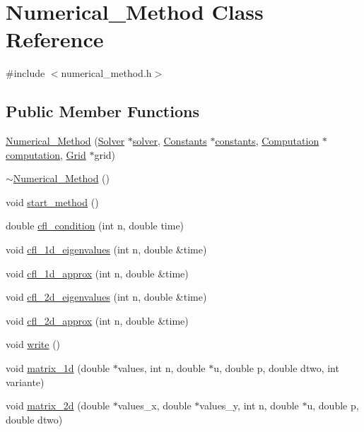 \hypertarget{classNumerical__Method}{\section{Numerical\-\_\-\-Method Class Reference}
\label{classNumerical__Method}
}


{\ttfamily \#include $<$numerical\-\_\-method.\-h$>$}

\subsection*{Public Member Functions}
\begin{DoxyCompactItemize}
\item 
\hyperlink{classNumerical__Method_a85c50cdbf748553e9d31b4066d2c022f}{Numerical\-\_\-\-Method} (\hyperlink{classSolver}{Solver} $\ast$\hyperlink{classNumerical__Method_ace474723e7f6407dea6b099a0f5d82f6}{solver}, \hyperlink{classConstants}{Constants} $\ast$\hyperlink{classNumerical__Method_a63a7ffa9eb0ab132ae008aa4d1e0dfc6}{constants}, \hyperlink{classComputation}{Computation} $\ast$\hyperlink{classNumerical__Method_aec80d2974afbd7ed72f7b7592b0f7595}{computation}, \hyperlink{classGrid}{Grid} $\ast$grid)
\item 
\hyperlink{classNumerical__Method_af7b847dd302c8d489e944ca24cd79b79}{$\sim$\-Numerical\-\_\-\-Method} ()
\item 
void \hyperlink{classNumerical__Method_a181d5218fdf2aeaa738c94613ff0921c}{start\-\_\-method} ()
\item 
double \hyperlink{classNumerical__Method_ace0a53699bed22690e5dccacd912aff7}{cfl\-\_\-condition} (int n, double time)
\item 
void \hyperlink{classNumerical__Method_a67738f11775c38a65a5c80caf8d8d1b3}{cfl\-\_\-1d\-\_\-eigenvalues} (int n, double \&time)
\item 
void \hyperlink{classNumerical__Method_a2e803d77e4bda6927c0a6ae6a5a6204d}{cfl\-\_\-1d\-\_\-approx} (int n, double \&time)
\item 
void \hyperlink{classNumerical__Method_a5716ee699a4c14a4c2ba211f7182f846}{cfl\-\_\-2d\-\_\-eigenvalues} (int n, double \&time)
\item 
void \hyperlink{classNumerical__Method_ad757e76048489549664925eca952c315}{cfl\-\_\-2d\-\_\-approx} (int n, double \&time)
\item 
void \hyperlink{classNumerical__Method_ad93454872f20536000b9585631dfb7b9}{write} ()
\item 
void \hyperlink{classNumerical__Method_a47e020d020e45910016f893dfbca7294}{matrix\-\_\-1d} (double $\ast$values, int n, double $\ast$u, double p, double dtwo, int variante)
\item 
void \hyperlink{classNumerical__Method_a108b1816052479a3fd104ddde7703016}{matrix\-\_\-2d} (double $\ast$values\-\_\-x, double $\ast$values\-\_\-y, int n, double $\ast$u, double p, double dtwo)
\end{DoxyCompactItemize}
